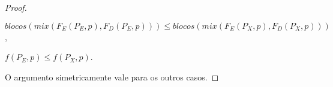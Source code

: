 \begin{proof}
    \begin{center}
        $blocos(mix(F_E(P_E,p), F_D(P_E,p))) \leq blocos(mix(F_E(P_X,p), F_D(P_X,p)))$,

        $f(P_E,p) \leq f(P_X,p)$.
    \end{center}
    O argumento simetricamente vale para os outros casos.
    \begin{comment}
    \begin{figure}
        \centering
        \begin{minipage}[t]{0.3\textwidth}
        \begin{tikzpicture}[scale=0.75,
            node/.style={circle,draw,minimum size=2em, thick, font=\large},
            nodeGray/.style={circle,draw,minimum size=2em, thick, font=\large, fill=gray!55}]
            
            
            \node[node] (D) at (0,0) {};
            \node[node] (B) at (-2,-1.5) {};
            \node[node] (A) at (-3.3,-3) {};
            \node[node] (C) at (-0.7,-3) {};
            \node[node] (E) at (0.7,-3) {$5$};
            \node[node] (F) at (2,-1.5) {};
            \node[node] (G) at (3.3,-3) {};
            \node[node] (H) at (2.6,-4.5) {$6$};
            \node[node] (I) at (3.9,-4.5) {$7$};
            \node[node] (J) at (-3.9,-4.5) {$1$};
            \node[node] (K) at (-2.6,-4.5) {$2$};
            \node[node] (L) at (-1.3,-4.5) {$3$};
            \node[node] (M) at (-0.1,-4.5) {$4$};
            
            \draw[thick, ->] (D) -- (B);%
            \draw[thick, ->] (B) -- (A);%
            \draw[thick, ->] (B) -- (C);%
            \draw[thick, ->] (G) -- (I);%
            \draw[thick, ->] (G) -- (H);%
            \draw[thick, ->] (A) -- (J);%
            \draw[thick, ->] (A) -- (K);%
            \draw[thick, ->] (C) -- (L);%
            \draw[thick, ->] (C) -- (M);%
            

\end{comment}
\end{proof}
